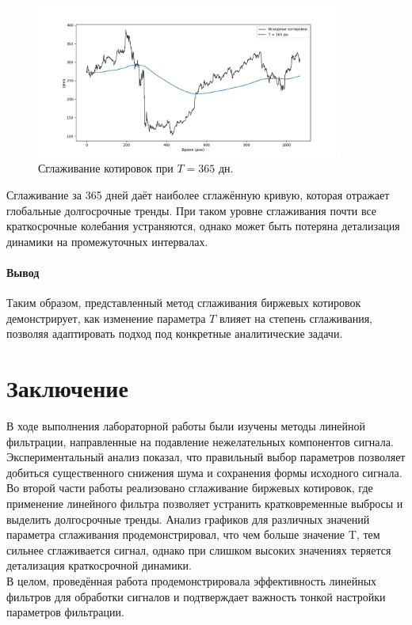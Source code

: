 \documentclass[a4paper]{article}
\newcommand{\addsection}[1]{
    \phantomsection
    \addcontentsline{toc}{section}{#1}
    \section*{#1}
}
\begin{document}
\begin{figure}[H]
  \centering
  \includegraphics[width=0.9\textwidth]{src/smooth_price_365.png}
  \caption{Сглаживание котировок при \(T=365\) дн.}
\end{figure}
\noindent Сглаживание за 365 дней даёт наиболее сглажённую кривую, которая отражает глобальные долгосрочные тренды. При таком уровне сглаживания почти все краткосрочные колебания устраняются, однако может быть потеряна детализация динамики на промежуточных интервалах.

\paragraph{Вывод}
Таким образом, представленный метод сглаживания биржевых котировок демонстрирует, как изменение параметра \(T\) влияет на степень сглаживания, позволяя адаптировать подход под конкретные аналитические задачи.

\addsection{Заключение}

В ходе выполнения лабораторной работы были изучены методы линейной фильтрации, направленные на подавление нежелательных компонентов сигнала. Экспериментальный анализ показал, что правильный выбор параметров позволяет добиться существенного снижения шума и сохранения формы исходного сигнала. \\[0.5em]
Во второй части работы реализовано сглаживание биржевых котировок, где применение линейного фильтра позволяет устранить кратковременные выбросы и выделить долгосрочные тренды. Анализ графиков для различных значений параметра сглаживания продемонстрировал, что чем больше значение T, тем сильнее сглаживается сигнал, однако при слишком высоких значениях теряется детализация краткосрочной динамики. \\[0.5em]
В целом, проведённая работа продемонстрировала эффективность линейных фильтров для обработки сигналов и подтверждает важность тонкой настройки параметров фильтрации.
\end{document}
